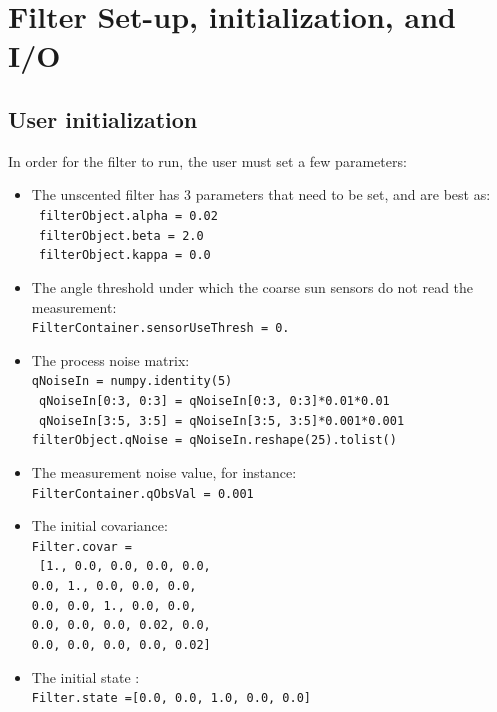 \documentclass[]{BasiliskReportMemo}
\begin{document}
\section{Filter Set-up, initialization, and I/O}

\subsection{User initialization}

In order for the filter to run, the user must set a few parameters:

\begin{itemize}
\item The unscented filter has 3 parameters that need to be set, and are best as: \\
      \texttt{ filterObject.alpha = 0.02} \\
      \texttt{ filterObject.beta = 2.0} \\
      \texttt{ filterObject.kappa = 0.0} 
\item The angle threshold under which the coarse sun sensors do not read the measurement: \\ 
\texttt{FilterContainer.sensorUseThresh = 0.}
\item The process noise matrix: \\
   \texttt{qNoiseIn = numpy.identity(5)} \\
   \texttt{ qNoiseIn[0:3, 0:3] = qNoiseIn[0:3, 0:3]*0.01*0.01} \\
   \texttt{ qNoiseIn[3:5, 3:5] = qNoiseIn[3:5, 3:5]*0.001*0.001} \\
    \texttt{filterObject.qNoise = qNoiseIn.reshape(25).tolist()}
\item The measurement noise value, for instance: \\
 \texttt{FilterContainer.qObsVal = 0.001}
\item The initial covariance: \\
 \texttt{Filter.covar =} \\
  \texttt{ [1., 0.0, 0.0, 0.0, 0.0, \\
                          0.0, 1., 0.0, 0.0, 0.0,\\
                          0.0, 0.0, 1., 0.0, 0.0,\\
                          0.0, 0.0, 0.0, 0.02, 0.0,\\
                          0.0, 0.0, 0.0, 0.0, 0.02]}
 \item The initial state :\\
 \texttt{Filter.state =[0.0, 0.0, 1.0, 0.0, 0.0]}
\end{itemize}
\end{document}

